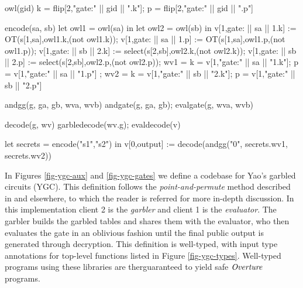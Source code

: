 {\footnotesize
\begin{verbatimtab}
  owl(gid) { { k = flip[2,"gate:" || gid || ".k"]; p = flip[2,"gate:" || gid || ".p"] } }

  encode(sa, sb) {
    let owl1 = owl(sa) in
    let owl2 = owl(sb) in
    v[1,gate: || sa || 1.k] := OT(s[1,sa],owl1.k,(not owl1.k));
    v[1,gate: || sa || 1.p] := OT(s[1,sa],owl1.p,(not owl1.p));
    v[1,gate: || sb || 2.k] := select(s[2,sb],owl2.k,(not owl2.k));
    v[1,gate: || sb || 2.p] := select(s[2,sb],owl2.p,(not owl2.p));
    { wv1 = { k = v[1,"gate:" || sa || "1.k"]; p = v[1,"gate:" || sa || "1.p"] };
      wv2 = { k = v[1,"gate:" || sb || "2.k"]; p = v[1,"gate:" || sb || "2.p"] } }
  }

  andgg(g, ga, gb, wva, wvb) { andgate(g, ga, gb); evalgate(g, wva, wvb) }

  decode(g, wv) { garbledecode(wv.g); evaldecode(v) }
\end{verbatimtab}
}

{\footnotesize
\begin{verbatimtab}
  let secrets = encode("s1","s2") in v[0,output] := decode(andgg("0", secrets.wv1, secrets.wv2)) \end{verbatimtab}
}



In Figures \ref{fig-ygc-aux} and \ref{fig-ygc-gates} we define a
codebase for Yao's garbled circuits (YGC). This definition follows the
\emph{point-and-permute} method described in \cite{evans2018pragmatic}
and elsewhere, to which the reader is referred for more in-depth discussion.
In this implementation client 2 is the \emph{garbler} and
client 1 is the \emph{evaluator}. The garbler builds the garbled
tables and shares them with the evaluator, who then evaluates
the gate in an oblivious fashion until the final public output is
generated through decryption. This definition is well-typed,
with input type annotations for top-level functions listed in
Figure \ref{fig-ygc-types}. Well-typed programs using these
libraries are therguaranteed to yield safe $\mathit{Overture}$
programs. 

